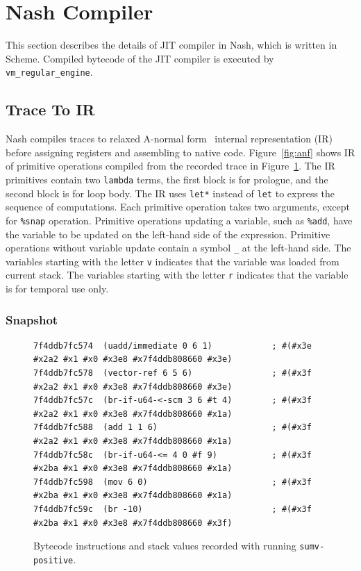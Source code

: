 \documentclass[preprint, 10pt]{sigplanconf}
\begin{document}
\section{Nash Compiler}
\label{sec:compiler}

This section describes the details of JIT compiler in Nash, which is written
in Scheme. Compiled bytecode of the JIT compiler is executed by
\texttt{vm\_regular\_engine}.

\subsection{Trace To IR}
Nash compiles traces to relaxed A-normal form~\cite{flanagan1993essence}
internal representation (IR) before assigning registers and assembling to
native code. Figure~\hyperref[fig:anf]{\ref{fig:anf}} shows IR of primitive
operations compiled from the recorded trace in
Figure~\hyperref[fig:trace]{\ref{fig:trace}}. The IR primitives contain two
\texttt{lambda} terms, the first block is for prologue, and the second block
is for loop body. The IR uses \texttt{let*} instead of \texttt{let} to express
the sequence of computations. Each primitive operation takes two arguments,
except for \texttt{\%snap} operation. Primitive operations updating a
variable, such as \texttt{\%add}, have the variable to be updated on the
left-hand side of the expression. Primitive operations without variable update
contain a symbol \texttt{\_} at the left-hand side. The variables starting
with the letter \texttt{v} indicates that the variable was loaded from current
stack. The variables starting with the letter \texttt{r} indicates that the
variable is for temporal use only.

\subsubsection{Snapshot}

\begin{figure}
  \centering
  \small
\begin{verbatim}
7f4ddb7fc574  (uadd/immediate 0 6 1)            ; #(#x3e #x2a2 #x1 #x0 #x3e8 #x7f4ddb808660 #x3e)
7f4ddb7fc578  (vector-ref 6 5 6)                ; #(#x3f #x2a2 #x1 #x0 #x3e8 #x7f4ddb808660 #x3e)
7f4ddb7fc57c  (br-if-u64-<-scm 3 6 #t 4)        ; #(#x3f #x2a2 #x1 #x0 #x3e8 #x7f4ddb808660 #x1a)
7f4ddb7fc588  (add 1 1 6)                       ; #(#x3f #x2a2 #x1 #x0 #x3e8 #x7f4ddb808660 #x1a)
7f4ddb7fc58c  (br-if-u64-<= 4 0 #f 9)           ; #(#x3f #x2ba #x1 #x0 #x3e8 #x7f4ddb808660 #x1a)
7f4ddb7fc598  (mov 6 0)                         ; #(#x3f #x2ba #x1 #x0 #x3e8 #x7f4ddb808660 #x1a)
7f4ddb7fc59c  (br -10)                          ; #(#x3f #x2ba #x1 #x0 #x3e8 #x7f4ddb808660 #x3f)
\end{verbatim}
\caption{Bytecode instructions and stack values recorded with running
  \texttt{sumv-positive}.}
\label{fig:trace}
\end{figure}
\end{document}
